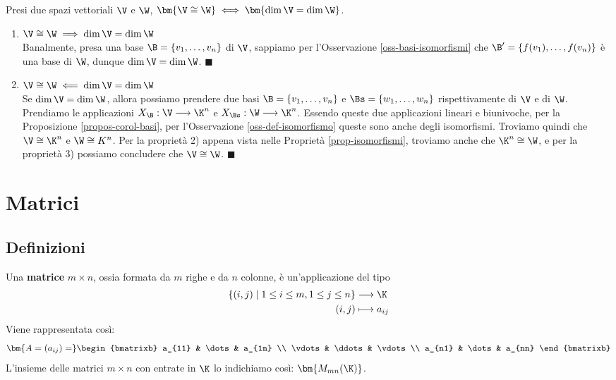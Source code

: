 \documentclass[11pt, a4paper, titlepage, oneside]{scrbook}
\begin{document}
\begin{Osservazione}[]
\label{oss-dim-isomorfismi}
Presi due spazi vettoriali $\V$ e $\W$, $\bm{\V \cong \W} \iff \bm{\dim \V = \dim \W}$.
\end{Osservazione}

\Dimostrazione \nopagebreak

\begin{enumerate}[label=\arabic*°]
    \item $\V \cong \W \implies \dim \V = \dim \W$ \\
    Banalmente, presa una base $\B = \{v_1, \ldots, v_n\}$ di $\V$, sappiamo per l'Osservazione \ref{oss-basi-isomorfismi} che $\B' = \{f(v_1), \ldots, f(v_n)\}$ è una base di $\W$, dunque $\dim \V = \dim \W$. $\blacksquare$
    \item $\V \cong \W \impliedby \dim \V = \dim \W$ \\
    Se $\dim \V = \dim \W$, allora possiamo prendere due basi $\B = \{v_1, \ldots, v_n\}$ e $\Bs = \{w_1, \ldots, w_n\}$ rispettivamente di $\V$ e di $\W$. Prendiamo le applicazioni $X_\B: \V \longrightarrow \K^n$ e $X_\Bs: \W \longrightarrow \K^n$. Essendo queste due applicazioni lineari e biunivoche, per la Proposizione \ref{propos-corol-basi}, per l'Osservazione \ref{oss-def-isomorfismo} queste sono anche degli isomorfismi. Troviamo quindi che $\V \cong \K^n$ e $\W \cong K^n$. Per la proprietà 2) appena vista nelle Proprietà \ref{prop-isomorfismi}, troviamo anche che $\K^n \cong \W$, e per la proprietà 3) possiamo concludere che $\V \cong \W$. $\blacksquare$
\end{enumerate}

\chapter{Matrici}

\section{Definizioni}

\begin{Definizione}[Matrice]
\label{def-matrice}
Una \textbf{matrice} $m \times n$, ossia formata da $m$ righe e da $n$ colonne, è un'applicazione del tipo
\begin{align*}
\{(i,j) \mid 1 \leq i \leq m, 1 \leq j \leq n\} & \longrightarrow \K \\
(i,j) &\longmapsto a_{ij}
\end{align*}
Viene rappresentata così:
\[
\bm{A = (a_{ij}) = }
\begin{bmatrixb}
a_{11} & \dots & a_{1n}   \\
\vdots & \ddots & \vdots \\
a_{n1} & \dots & a_{nn}
\end{bmatrixb}
\]
L'insieme delle matrici $m \times n$ con entrate in $\K$ lo indichiamo così: $\bm{M_{mn}(\K)}$.
\end{Definizione}
\end{document}
